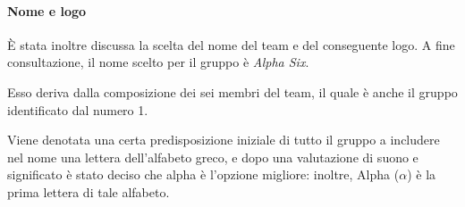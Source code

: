 \documentclass[a4paper, oneside, openany]{article}
\begin{document}
            \paragraph{Nome e logo}
            È stata inoltre discussa la scelta del nome del team e del conseguente logo. A fine consultazione, il nome scelto
            per il gruppo è \textit{Alpha Six}.\par
            Esso deriva dalla composizione dei sei membri del team, il quale è anche il gruppo identificato dal numero 1.\par
            Viene denotata una certa predisposizione iniziale di tutto il gruppo a includere nel nome una lettera dell'alfabeto greco,
            e dopo una valutazione di suono e significato è stato deciso che alpha è l'opzione migliore: inoltre, Alpha ($\alpha$) è
            la prima lettera di tale alfabeto.
\end{document}
